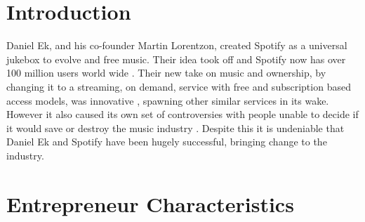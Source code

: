 \section{Introduction}
Daniel Ek, and his co-founder Martin Lorentzon, created Spotify as a universal jukebox to evolve and free music. Their idea took off and Spotify now has over 100 million users world wide \parencite{100m_spotify}. Their new take on music and ownership, by changing it to a streaming, on demand, service with free and subscription based access models, was innovative \parencite{wired_influencer}, spawning other similar services in its wake. However it also caused its own set of controversies with people unable to decide if it would save or destroy the music industry \parencite{guardian_swift, guardian_save_or_destroy}. Despite this it is undeniable that Daniel Ek and Spotify have been hugely successful, bringing change to the industry.

\section{Entrepreneur Characteristics}

